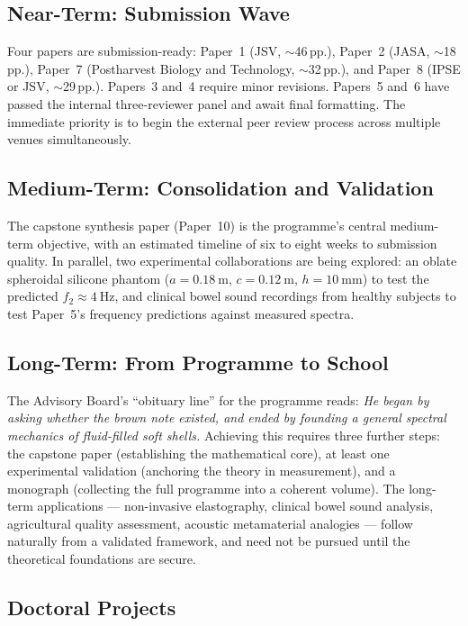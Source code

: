 \documentclass[11pt,a4paper]{article}
\begin{document}
\subsection{Near-Term: Submission Wave}

Four papers are submission-ready: Paper~1 (JSV, $\sim$46\,pp.), Paper~2 (JASA, $\sim$18\,pp.), Paper~7 (Postharvest Biology and Technology, $\sim$32\,pp.), and Paper~8 (IPSE or JSV, $\sim$29\,pp.). Papers~3 and~4 require minor revisions. Papers~5 and~6 have passed the internal three-reviewer panel and await final formatting. The immediate priority is to begin the external peer review process across multiple venues simultaneously.

\subsection{Medium-Term: Consolidation and Validation}

The capstone synthesis paper (Paper~10) is the programme's central medium-term objective, with an estimated timeline of six to eight weeks to submission quality. In parallel, two experimental collaborations are being explored: an oblate spheroidal silicone phantom ($a = \SI{0.18}{\m}$, $c = \SI{0.12}{\m}$, $h = \SI{10}{\mm}$) to test the predicted $f_2 \approx \SI{4}{\Hz}$, and clinical bowel sound recordings from healthy subjects to test Paper~5's frequency predictions against measured spectra.

\subsection{Long-Term: From Programme to School}

The Advisory Board's ``obituary line'' for the programme reads: \emph{He began by asking whether the brown note existed, and ended by founding a general spectral mechanics of fluid-filled soft shells.} Achieving this requires three further steps: the capstone paper (establishing the mathematical core), at least one experimental validation (anchoring the theory in measurement), and a monograph (collecting the full programme into a coherent volume). The long-term applications --- non-invasive elastography, clinical bowel sound analysis, agricultural quality assessment, acoustic metamaterial analogies --- follow naturally from a validated framework, and need not be pursued until the theoretical foundations are secure.

\subsection{Doctoral Projects}
\end{document}
